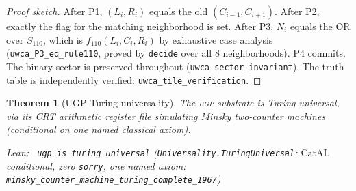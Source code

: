 \documentclass[11pt,a4paper]{article}
\newenvironment{leanref}%
  {\par\smallskip\noindent\begingroup\raggedright\textup{Lean:}~}%
  {\par\endgroup}
\newtheorem{theorem}{Theorem}[section]
\theoremstyle{definition}
\newcommand{\ugp}{\textsc{ugp}}
\newcommand{\CatAL}{\ensuremath{\mathrm{CatAL}}}
\begin{document}
\begin{proof}[Proof sketch]
After P1, $(L_i, R_i)$ equals the old $(C_{i-1}, C_{i+1})$.
After P2, exactly the flag for the matching neighborhood is set.
After P3, $N_i$ equals the OR over $S_{110}$, which is $f_{110}(L_i, C_i, R_i)$
by exhaustive case analysis (\lstinline|uwca_P3_eq_rule110|, proved by \lstinline|decide|
over all 8 neighborhoods). P4 commits.
The binary sector is preserved throughout (\lstinline|uwca_sector_invariant|).
The truth table is independently verified: \lstinline|uwca_tile_verification|.
\end{proof}

\begin{theorem}[UGP Turing universality]\label{thm:turing}
The \ugp{} substrate is Turing-universal, via its CRT arithmetic register file
simulating Minsky two-counter machines (conditional on one named classical axiom).

\begin{leanref} \lstinline|ugp_is_turing_universal|
\textup{(\texttt{Universality.TuringUniversal}; \CatAL{} conditional, zero
\texttt{sorry}, one named axiom:
\lstinline|minsky_counter_machine_turing_complete_1967|)}
\end{leanref}
\end{theorem}
\end{document}
